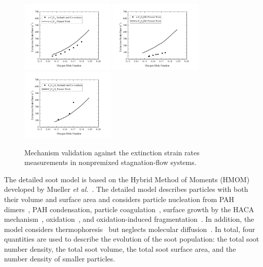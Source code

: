 \documentclass[review,3p,times]{elsarticleUS}
\begin{document}
\begin{figure}[ht]
  \centering
  \scriptsize
  \includegraphics[trim=4mm 8mm 30mm 20mm, clip=true, width=0.4\textwidth]{NH-ESR.png}
  \includegraphics[trim=4mm 8mm 30mm 20mm, clip=true, width=0.4\textwidth]{NB-ESR.png}\\
   \vspace{0.5in}
  \includegraphics[trim=4mm 8mm 30mm 20mm, clip=true, width=0.4\textwidth]{MB-ESR.png}
  \normalsize
  \vspace{-0.1in}
  \caption{Mechanism validation against the extinction strain rates measurements in nonpremixed stagnation-flow systems.}
  \label{fig:validation-ESR}
\end{figure}

The detailed soot model is based on the Hybrid Method of Moments (HMOM) developed by Mueller \emph{et al.}~\cite{mueller09a,mueller09b,mueller11a}. The detailed model describes particles with both their volume and surface area and considers particle nucleation from PAH dimers~\cite{schuetz02,wong09,blanquart09c}, PAH condensation, particle coagulation~\cite{mueller09b}, surface growth by the HACA mechanism~\cite{frenklach91}, oxidation~\cite{kazakov95,neoh81}, and oxidation-induced fragmentation~\cite{mueller11a}. In addition, the model considers thermophoresis~\cite{waldmann66} but neglects molecular diffusion~\cite{bisetti12}. In total, four quantities are used to describe the evolution of the soot population: the total soot number density, the total soot volume, the total soot surface area, and the number density of smaller particles.
\end{document}
